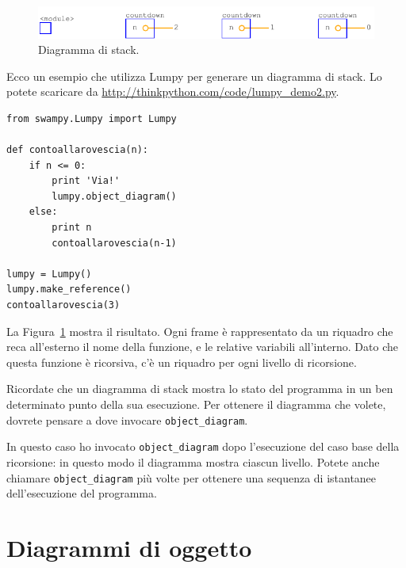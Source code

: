 \documentclass[10pt]{book}
\begin{document}
\begin{figure}
\centerline
{\includegraphics[scale=0.7]{figs/lumpydemo2.pdf}}
\caption{Diagramma di stack.}
\label{fig.lumpy2}
\end{figure}

Ecco un esempio che utilizza Lumpy per generare un diagramma di stack. Lo potete scaricare da \url{http://thinkpython.com/code/lumpy_demo2.py}.
 

\begin{verbatim}
from swampy.Lumpy import Lumpy

def contoallarovescia(n):
    if n <= 0:
        print 'Via!'
        lumpy.object_diagram()
    else:
        print n
        contoallarovescia(n-1)

lumpy = Lumpy()
lumpy.make_reference()
contoallarovescia(3)
\end{verbatim}

La Figura~\ref{fig.lumpy2} mostra il risultato. Ogni frame è rappresentato da un riquadro che reca all'esterno il nome della funzione, e le relative variabili all'interno. Dato che questa funzione è ricorsiva, c'è un riquadro per ogni livello di ricorsione.

Ricordate che un diagramma di stack mostra lo stato del programma in un ben determinato punto della sua esecuzione. Per ottenere il diagramma che volete, dovrete pensare a dove invocare \verb"object_diagram".

In questo caso ho invocato \verb"object_diagram" dopo l'esecuzione del caso base della ricorsione: in questo modo il diagramma mostra ciascun livello. Potete anche chiamare \verb"object_diagram" più volte per ottenere una sequenza di istantanee dell'esecuzione del programma.


\section{Diagrammi di oggetto}
\end{document}
